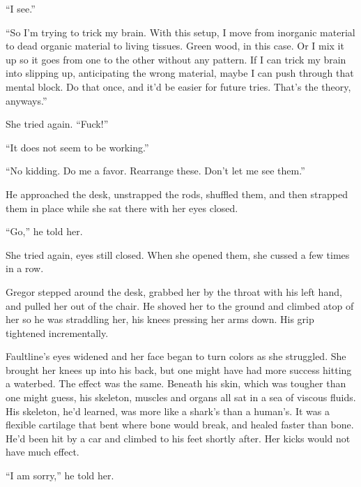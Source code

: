 ``I see.''



``So I'm trying to trick my brain.  With this setup, I move from inorganic material to dead organic material to living tissues.  Green wood, in this case.  Or I mix it up so it goes from one to the other without any pattern.  If I can trick my brain into slipping up, anticipating the wrong material, maybe I can push through that mental block.  Do that once, and it'd be easier for future tries.  That's the theory, anyways.''



She tried again.  ``Fuck!''



``It does not seem to be working.''



``No kidding.  Do me a favor.  Rearrange these.  Don't let me see them.''



He approached the desk, unstrapped the rods, shuffled them, and then strapped them in place while she sat there with her eyes closed.



``Go,'' he told her.



She tried again, eyes still closed.  When she opened them, she cussed a few times in a row.



Gregor stepped around the desk, grabbed her by the throat with his left hand, and pulled her out of the chair.  He shoved her to the ground and climbed atop of her so he was straddling her, his knees pressing her arms down.  His grip tightened incrementally.



Faultline's eyes widened and her face began to turn colors as she struggled.  She brought her knees up into his back, but one might have had more success hitting a waterbed.  The effect was the same.  Beneath his skin, which was tougher than one might guess, his skeleton, muscles and organs all sat in a sea of viscous fluids.  His skeleton, he'd learned, was more like a shark's than a human's.  It was a flexible cartilage that bent where bone would break, and healed faster than bone.  He'd been hit by a car and climbed to his feet shortly after.  Her kicks would not have much effect.



``I am sorry,'' he told her.



